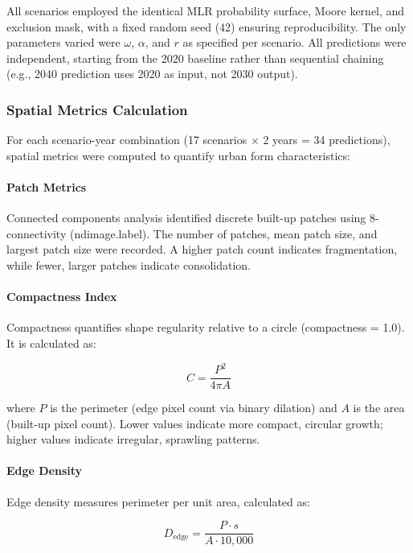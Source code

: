 \documentclass[conference]{IEEEtran}
\begin{document}
All scenarios employed the identical MLR probability surface, Moore kernel, and exclusion mask, with a fixed random seed (42) ensuring reproducibility. The only parameters varied were $\omega$, $\alpha$, and $r$ as specified per scenario. All predictions were independent, starting from the 2020 baseline rather than sequential chaining (e.g., 2040 prediction uses 2020 as input, not 2030 output).

\subsubsection{Spatial Metrics Calculation}

For each scenario-year combination (17 scenarios $\times$ 2 years = 34 predictions), spatial metrics were computed to quantify urban form characteristics:

\paragraph{Patch Metrics}
Connected components analysis identified discrete built-up patches using 8-connectivity (ndimage.label). The number of patches, mean patch size, and largest patch size were recorded. A higher patch count indicates fragmentation, while fewer, larger patches indicate consolidation.

\paragraph{Compactness Index}
Compactness quantifies shape regularity relative to a circle (compactness = 1.0). It is calculated as:

\begin{equation}
C = \frac{P^2}{4\pi A}
\label{eq:compactness}
\end{equation}

where $P$ is the perimeter (edge pixel count via binary dilation) and $A$ is the area (built-up pixel count). Lower values indicate more compact, circular growth; higher values indicate irregular, sprawling patterns.

\paragraph{Edge Density}
Edge density measures perimeter per unit area, calculated as:

\begin{equation}
D_{\text{edge}} = \frac{P \cdot s}{A \cdot 10{,}000}
\label{eq:edge_density}
\end{equation}
\end{document}
